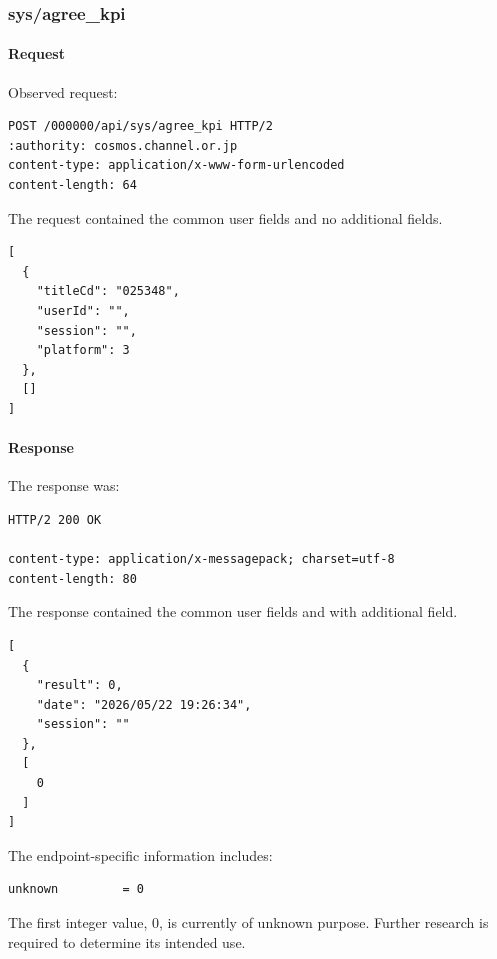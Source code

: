 \subsubsection{sys/agree\_kpi}
\label{subsec:api_sys_agree_kpi}

\paragraph{Request}

Observed request:

\begin{lstlisting}
POST /000000/api/sys/agree_kpi HTTP/2
:authority: cosmos.channel.or.jp
content-type: application/x-www-form-urlencoded
content-length: 64
\end{lstlisting}

The request contained the common user fields and no additional fields.

\begin{lstlisting}
[
  {
    "titleCd": "025348",
    "userId": "",
    "session": "",
    "platform": 3
  },
  []
]
\end{lstlisting}

\paragraph{Response}

The response was:

\begin{lstlisting}
HTTP/2 200 OK

content-type: application/x-messagepack; charset=utf-8
content-length: 80
\end{lstlisting}

The response contained the common user fields and with additional field.

\begin{lstlisting}
[
  {
    "result": 0,
    "date": "2026/05/22 19:26:34",
    "session": ""
  },
  [
    0
  ]
]
\end{lstlisting}

The endpoint-specific information includes:

\begin{lstlisting}
unknown         = 0
\end{lstlisting}

\begin{tcolorbox}[colback=yellow!10,colframe=orange!80!black,title=Warning]
The first integer value, $0$, is currently of unknown purpose.
Further research is required to determine its intended use.
\end{tcolorbox}

\newpage